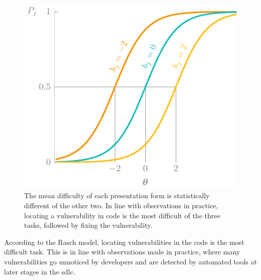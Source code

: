 \begin{figure}
    \centering
    \includegraphics[page=22]{03-education/figures/tikzfigures.pdf}
    \caption[Mean difficulty of challenge presentation]{The mean difficulty of each presentation form is statistically different of the other two. In line with observations in practice, locating a vulnerability in code is the most difficult of the three tasks, followed by fixing the vulnerability.}
    \label{fig:presentation}
\end{figure}

According to the Rasch model, locating vulnerabilities in the code is the most difficult task.
This is in line with observations made in practice, where many vulnerabilities go unnoticed by developers and are detected by automated tools at later stages in the \gls{sdlc}.